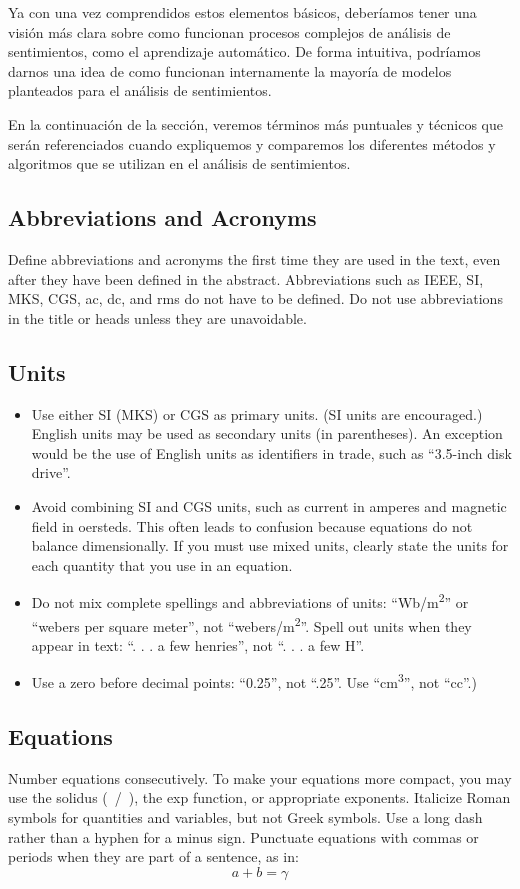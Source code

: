 \documentclass[conference]{IEEEtran}
\begin{document}
Ya con una vez comprendidos estos elementos básicos, deberíamos tener una visión más clara sobre como funcionan procesos complejos de análisis de sentimientos, como el aprendizaje automático. De forma intuitiva, podríamos darnos una idea de como funcionan internamente la mayoría de modelos planteados para el análisis de sentimientos.

En la continuación de la sección, veremos términos más puntuales y técnicos que serán referenciados cuando expliquemos y comparemos los diferentes métodos y algoritmos que se utilizan en el análisis de sentimientos.

\subsection{Abbreviations and Acronyms}\label{AA}
Define abbreviations and acronyms the first time they are used in the text, 
even after they have been defined in the abstract. Abbreviations such as 
IEEE, SI, MKS, CGS, ac, dc, and rms do not have to be defined. Do not use 
abbreviations in the title or heads unless they are unavoidable.

\subsection{Units}
\begin{itemize}
\item Use either SI (MKS) or CGS as primary units. (SI units are encouraged.) English units may be used as secondary units (in parentheses). An exception would be the use of English units as identifiers in trade, such as ``3.5-inch disk drive''.
\item Avoid combining SI and CGS units, such as current in amperes and magnetic field in oersteds. This often leads to confusion because equations do not balance dimensionally. If you must use mixed units, clearly state the units for each quantity that you use in an equation.
\item Do not mix complete spellings and abbreviations of units: ``Wb/m\textsuperscript{2}'' or ``webers per square meter'', not ``webers/m\textsuperscript{2}''. Spell out units when they appear in text: ``. . . a few henries'', not ``. . . a few H''.
\item Use a zero before decimal points: ``0.25'', not ``.25''. Use ``cm\textsuperscript{3}'', not ``cc''.)
\end{itemize}

\subsection{Equations}
Number equations consecutively. To make your 
equations more compact, you may use the solidus (~/~), the exp function, or 
appropriate exponents. Italicize Roman symbols for quantities and variables, 
but not Greek symbols. Use a long dash rather than a hyphen for a minus 
sign. Punctuate equations with commas or periods when they are part of a 
sentence, as in:
\begin{equation}
a+b=\gamma\label{eq}
\end{equation}
\end{document}
